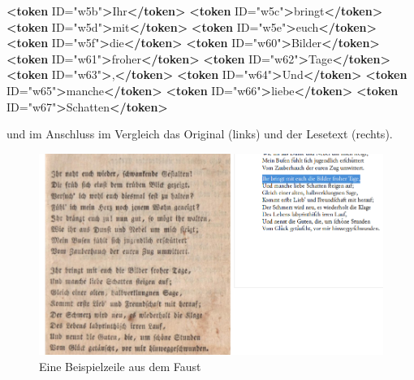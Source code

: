 \documentclass[12pt,ngerman,]{article}
\newenvironment{Shaded}{}{}
\newcommand{\KeywordTok}[1]{\textcolor[rgb]{0.00,0.44,0.13}{\textbf{#1}}}
\newcommand{\StringTok}[1]{\textcolor[rgb]{0.25,0.44,0.63}{#1}}
\newcommand{\OtherTok}[1]{\textcolor[rgb]{0.00,0.44,0.13}{#1}}
\newcommand{\NormalTok}[1]{#1}
\begin{document}
\begin{Shaded}
\begin{Highlighting}[]
\KeywordTok{<token}\OtherTok{ ID=}\StringTok{"w5b"}\KeywordTok{>}\NormalTok{Ihr}\KeywordTok{</token>}
\KeywordTok{<token}\OtherTok{ ID=}\StringTok{"w5c"}\KeywordTok{>}\NormalTok{bringt}\KeywordTok{</token>}
\KeywordTok{<token}\OtherTok{ ID=}\StringTok{"w5d"}\KeywordTok{>}\NormalTok{mit}\KeywordTok{</token>}
\KeywordTok{<token}\OtherTok{ ID=}\StringTok{"w5e"}\KeywordTok{>}\NormalTok{euch}\KeywordTok{</token>}
\KeywordTok{<token}\OtherTok{ ID=}\StringTok{"w5f"}\KeywordTok{>}\NormalTok{die}\KeywordTok{</token>}
\KeywordTok{<token}\OtherTok{ ID=}\StringTok{"w60"}\KeywordTok{>}\NormalTok{Bilder}\KeywordTok{</token>}
\KeywordTok{<token}\OtherTok{ ID=}\StringTok{"w61"}\KeywordTok{>}\NormalTok{froher}\KeywordTok{</token>}
\KeywordTok{<token}\OtherTok{ ID=}\StringTok{"w62"}\KeywordTok{>}\NormalTok{Tage}\KeywordTok{</token>}
\KeywordTok{<token}\OtherTok{ ID=}\StringTok{"w63"}\KeywordTok{>}\NormalTok{,}\KeywordTok{</token>}
\KeywordTok{<token}\OtherTok{ ID=}\StringTok{"w64"}\KeywordTok{>}\NormalTok{Und}\KeywordTok{</token>}
\KeywordTok{<token}\OtherTok{ ID=}\StringTok{"w65"}\KeywordTok{>}\NormalTok{manche}\KeywordTok{</token>}
\KeywordTok{<token}\OtherTok{ ID=}\StringTok{"w66"}\KeywordTok{>}\NormalTok{liebe}\KeywordTok{</token>}
\KeywordTok{<token}\OtherTok{ ID=}\StringTok{"w67"}\KeywordTok{>}\NormalTok{Schatten}\KeywordTok{</token>}
\end{Highlighting}
\end{Shaded}

und im Anschluss im Vergleich das Original (links) und der Lesetext
(rechts).

\begin{figure}
\centering
\includegraphics{Bilder/Faust-S11-Faks.png}
\caption{Eine Beispielzeile aus dem Faust}
\end{figure}
\end{document}
